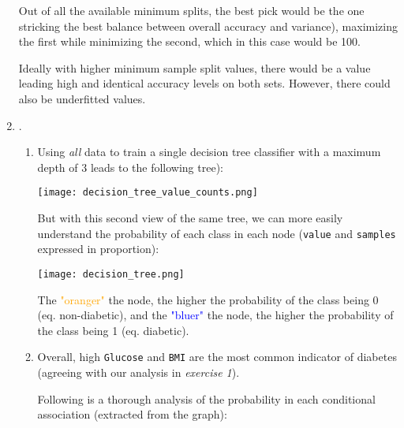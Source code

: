 \documentclass[12pt]{article}
\begin{document}
\begin{enumerate}[leftmargin=\labelsep, label=\textbf{\arabic*.)}]
          Out of all the available minimum splits, the best pick would be the one stricking the best balance between overall accuracy and variance), maximizing the first while minimizing the second, which in this case would be 100.

          Ideally with higher minimum sample split values, there would be a value leading high and identical accuracy levels on both sets. However, there could also be underfitted values.
    \item .
          \begin{enumerate}[label=\textbf{\roman*.)},leftmargin=0em]
              \item Using \textit{all} data to train a single decision tree classifier with a maximum depth of 3 leads to the following tree):\\
                    \begin{center}
                        \texttt{[image: decision\_tree\_value\_counts.png]}
                    \end{center}

                    But with this second view of the same tree, we can more easily understand the probability of each class in each node (\texttt{value} and \texttt{samples} expressed in proportion):

                    \begin{center}
                        \texttt{[image: decision\_tree.png]}
                    \end{center}

                    The \textcolor{orange}{"oranger"} the node, the higher the probability of the class being 0 (eq. non-diabetic), and the \textcolor{blue}{"bluer"} the node, the higher the probability of the class being 1 (eq. diabetic).

              \item Overall, high \texttt{Glucose} and \texttt{BMI} are the most common indicator of diabetes (agreeing with our analysis in \textit{exercise 1}).

                    Following is a thorough analysis of the probability in each conditional association (extracted from the graph):


\end{enumerate}
\end{enumerate}
\end{document}
